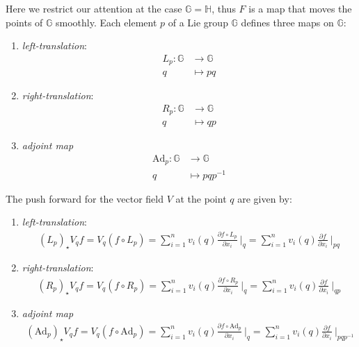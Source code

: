 \noindent
Here we restrict our attention at the case $\mathbb{G}=\mathbb{H}$, thus $F$ is a map that moves the points of $\mathbb{G}$ smoothly.
Each element $p$ of a Lie group $\mathbb{G}$ defines three maps on $\mathbb{G}$:
\begin{enumerate}
	\item \emph{left-translation}:
	\begin{align*}
	L_{p}: \mathbb{G} & \longrightarrow  \mathbb{G} \\
	q &\longmapsto pq
	\end{align*}
	\item \emph{right-translation}:
	\begin{align*}
	R_{p}: \mathbb{G} & \longrightarrow  \mathbb{G}\\
	q &\longmapsto qp
	\end{align*}
	\item \emph{adjoint map} 
	\begin{align*}
	\text{Ad}_{p}: \mathbb{G} & \longrightarrow  \mathbb{G} \\
	q &\longmapsto pqp^{-1}
	\end{align*}
\end{enumerate}
The push forward for the vector field $V$ at the point $q$ are given by:
\begin{enumerate}
	\item \emph{left-translation}:
	\begin{align*}
	(L_{p})_{\star}V_{q}f 
	=
	V_{q}(f\circ L_{p}) 
	=
	\sum_{i=1}^{n} v_{i}(q) \frac{\partial f \circ L_{p}}{\partial x_{i}} ~\Bigr|_{q} 
	=   
	\sum_{i=1}^{n} v_{i}(q) \frac{\partial f }{\partial x_{i}} ~\Bigr|_{pq} 
	\end{align*}
	\item \emph{right-translation}:
	\begin{align*}
	(R_{p})_{\star}V_{q}f 
	=
	V_{q}(f\circ R_{p}) 
	=
	\sum_{i=1}^{n} v_{i}(q) \frac{\partial f \circ R_{p}}{\partial x_{i}} ~\Bigr|_{q} 
	=   
	\sum_{i=1}^{n} v_{i}(q) \frac{\partial f }{\partial x_{i}} ~\Bigr|_{qp} 
	\end{align*}
	\item \emph{adjoint map} 
	\begin{align*}
	(\text{Ad}_{p})_{\star}V_{q}f 
	=
	V_{q}(f\circ \text{Ad}_{p}) 
	=
	\sum_{i=1}^{n} v_{i}(q) \frac{\partial f \circ \text{Ad}_{p}}{\partial x_{i}} ~\Bigr|_{q} 
	=   
	\sum_{i=1}^{n} v_{i}(q) \frac{\partial f }{\partial x_{i}} ~\Bigr|_{pqp^{-1}} 
	\end{align*}
\end{enumerate}

